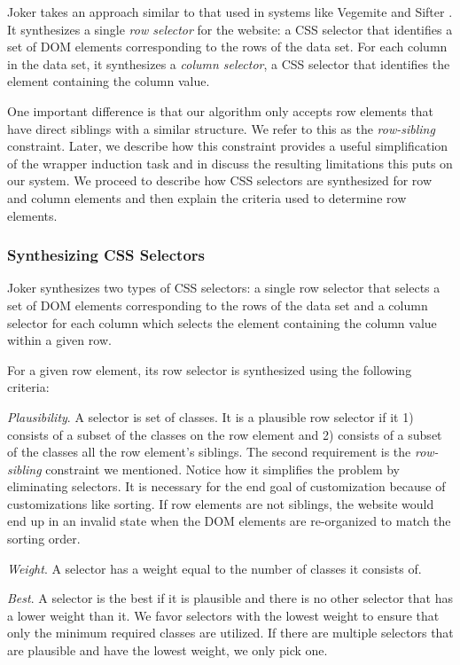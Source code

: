 \documentclass[sigconf,10pt]{acmart}
\begin{document}
Joker takes an approach similar to that used in systems like Vegemite
\citep{lin2009} and Sifter \citep{huynh2006}. It synthesizes a single
\emph{row selector} for the website: a CSS selector that identifies a
set of DOM elements corresponding to the rows of the data set. For each
column in the data set, it synthesizes a \emph{column selector}, a CSS
selector that identifies the element containing the column value.

One important difference is that our algorithm only accepts row elements
that have direct siblings with a similar structure. We refer to this as
the \emph{row-sibling} constraint. Later, we describe how this
constraint provides a useful simplification of the wrapper induction
task and in \citep{section:evaluation} discuss the resulting limitations
this puts on our system. We proceed to describe how CSS selectors are
synthesized for row and column elements and then explain the criteria
used to determine row elements.

\hypertarget{synthesizing-css-selectors}{%
\subsubsection{Synthesizing CSS
Selectors}\label{synthesizing-css-selectors}}

Joker synthesizes two types of CSS selectors: a single row selector that
selects a set of DOM elements corresponding to the rows of the data set
and a column selector for each column which selects the element
containing the column value within a given row.

For a given row element, its row selector is synthesized using the
following criteria:

\emph{Plausibility}. A selector is set of classes. It is a plausible row
selector if it 1) consists of a subset of the classes on the row element
and 2) consists of a subset of the classes all the row element's
siblings. The second requirement is the \emph{row-sibling} constraint we
mentioned. Notice how it simplifies the problem by eliminating
selectors. It is necessary for the end goal of customization because of
customizations like sorting. If row elements are not siblings, the
website would end up in an invalid state when the DOM elements are
re-organized to match the sorting order.

\emph{Weight}. A selector has a weight equal to the number of classes it
consists of.

\emph{Best}. A selector is the best if it is plausible and there is no
other selector that has a lower weight than it. We favor selectors with
the lowest weight to ensure that only the minimum required classes are
utilized. If there are multiple selectors that are plausible and have
the lowest weight, we only pick one.
\end{document}
